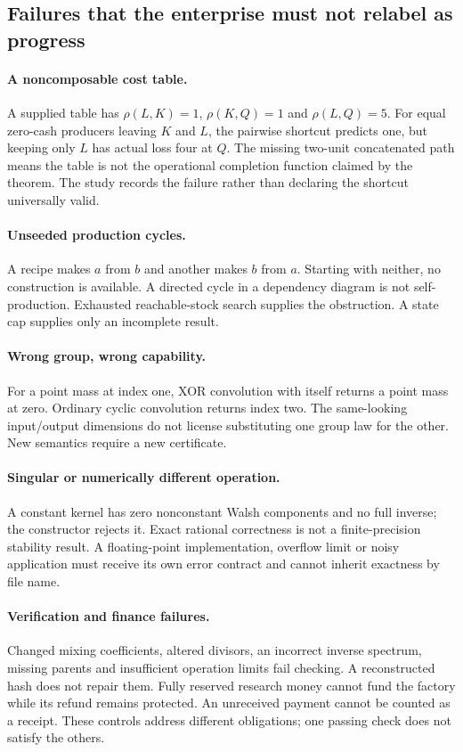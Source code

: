 \documentclass[11pt,letterpaper]{article}
\theoremstyle{definition}\newtheorem{definition}[theorem]{Definition}
\theoremstyle{remark}\newtheorem{remark}[theorem]{Remark}
\begin{document}
\subsection{Failures that the enterprise must not relabel as progress}
\paragraph{A noncomposable cost table.}
A supplied table has $\rho(L,K)=1$, $\rho(K,Q)=1$ and $\rho(L,Q)=5$. For equal zero-cash producers leaving $K$ and $L$, the pairwise shortcut predicts one, but keeping only $L$ has actual loss four at $Q$. The missing two-unit concatenated path means the table is not the operational completion function claimed by the theorem. The study records the failure rather than declaring the shortcut universally valid.

\paragraph{Unseeded production cycles.}
A recipe makes $a$ from $b$ and another makes $b$ from $a$. Starting with neither, no construction is available. A directed cycle in a dependency diagram is not self-production. Exhausted reachable-stock search supplies the obstruction. A state cap supplies only an incomplete result.

\paragraph{Wrong group, wrong capability.}
For a point mass at index one, XOR convolution with itself returns a point mass at zero. Ordinary cyclic convolution returns index two. The same-looking input/output dimensions do not license substituting one group law for the other. New semantics require a new certificate.

\paragraph{Singular or numerically different operation.}
A constant kernel has zero nonconstant Walsh components and no full inverse; the constructor rejects it. Exact rational correctness is not a finite-precision stability result. A floating-point implementation, overflow limit or noisy application must receive its own error contract and cannot inherit exactness by file name.

\paragraph{Verification and finance failures.}
Changed mixing coefficients, altered divisors, an incorrect inverse spectrum, missing parents and insufficient operation limits fail checking. A reconstructed hash does not repair them. Fully reserved research money cannot fund the factory while its refund remains protected. An unreceived payment cannot be counted as a receipt. These controls address different obligations; one passing check does not satisfy the others.
\end{document}

